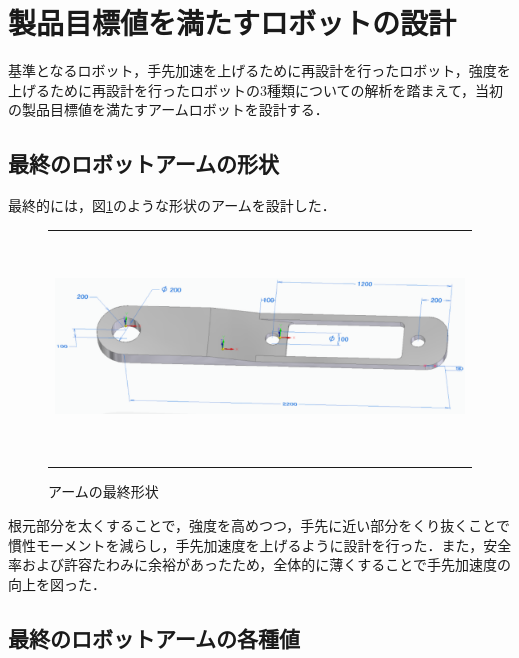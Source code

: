 \section{製品目標値を満たすロボットの設計}\label{ux88fdux54c1ux76eeux6a19ux5024ux3092ux6e80ux305fux3059ux30edux30dcux30c3ux30c8ux306eux8a2dux8a08}

基準となるロボット，手先加速を上げるために再設計を行ったロボット，強度を上げるために再設計を行ったロボットの3種類についての解析を踏まえて，当初の製品目標値を満たすアームロボットを設計する．

\subsection{最終のロボットアームの形状}\label{ux6700ux7d42ux306eux30edux30dcux30c3ux30c8ux30a2ux30fcux30e0ux306eux5f62ux72b6}

最終的には，図\ref{last-robot-arm}のような形状のアームを設計した．

\begin{figure}[htbp]
  \begin{center}
    \begin{tabular}{c}
      \includegraphics[height=6.0cm]{img/eps/last-robot-arm.eps}
    \end{tabular}
    \caption{アームの最終形状}
    \label{last-robot-arm}
  \end{center}
\end{figure}

根元部分を太くすることで，強度を高めつつ，手先に近い部分をくり抜くことで慣性モーメントを減らし，手先加速度を上げるように設計を行った．また，安全率および許容たわみに余裕があったため，全体的に薄くすることで手先加速度の向上を図った．

\subsection{最終のロボットアームの各種値}\label{ux6700ux7d42ux306eux30edux30dcux30c3ux30c8ux30a2ux30fcux30e0ux306eux5404ux7a2eux5024}

